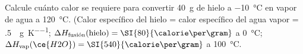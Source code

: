Calcule cuánto calor se requiere para convertir \SI{40}{\gram} de hielo a \SI{-10}{\celsius} en vapor de agua a \SI{120}{\celsius}. (Calor específico del hielo = calor específico del agua vapor = \SI{,5}{\calorie\per\gram\per\kelvin}; $\Delta H_{\text{fusión}}(\text{hielo}) = \SI{80}{\calorie\per\gram}$ a \SI{0}{\celsius}; $\Delta H_{\text{vap}}(\ce{H2O}) = \SI{540}{\calorie\per\gram}$ a \SI{100}{\celsius}.
